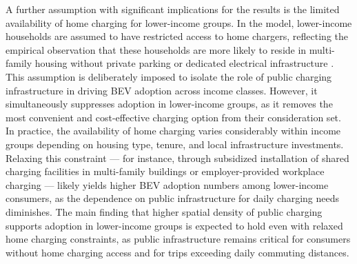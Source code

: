 A further assumption with significant implications for the results is the limited availability of home charging for lower-income groups. In the model, lower-income households are assumed to have restricted access to home chargers, reflecting the empirical observation that these households are more likely to reside in multi-family housing without private parking or dedicated electrical infrastructure \cite{BRUCKMANN2021102615}. This assumption is deliberately imposed to isolate the role of public charging infrastructure in driving \ac{BEV} adoption across income classes. However, it simultaneously suppresses adoption in lower-income groups, as it removes the most convenient and cost-effective charging option from their consideration set. In practice, the availability of home charging varies considerably within income groups depending on housing type, tenure, and local infrastructure investments. Relaxing this constraint — for instance, through subsidized installation of shared charging facilities in multi-family buildings or employer-provided workplace charging — likely yields higher \ac{BEV} adoption numbers among lower-income consumers, as the dependence on public infrastructure for daily charging needs diminishes. The main finding that higher spatial density of public charging supports adoption in lower-income groups is expected to hold even with relaxed home charging constraints, as public infrastructure remains critical for consumers without home charging access and for trips exceeding daily commuting distances.



